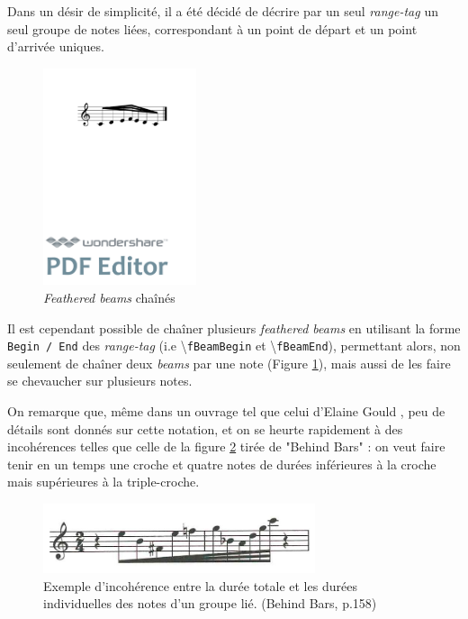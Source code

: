 \documentclass{article}
\newenvironment{gmncode}	{\vspace{-2mm}\small\verbatim}{\endverbatim\vspace{-2mm}}
\newcommand{\code}[1]		{{\small \texttt{#1}}}
\newcommand{\guidotag}[1]	{\textbackslash\code{#1}}
\begin{document}
Dans un désir de simplicité, il a été décidé de décrire par un seul \emph{range-tag} un seul groupe de notes liées, correspondant à un point de départ et un point d'arrivée uniques.

\begin{figure}[h]
\centering
\begin{gmncode}
[ 
  \fBeamBegin:1 c/8 d e/16 
  \fBeamBegin:2 f/32 \fBeamEnd:1 
  e/16 d/8 c \fBeamEnd:2 
]
\end{gmncode}
\includegraphics[width=45mm]{img/fBeamChaine.pdf}
\caption{\emph{Feathered beams} chaînés}
\label{fig:fbeamchain}
\end{figure}

Il est cependant possible de chaîner plusieurs \emph{feathered beams} en utilisant la forme \code{Begin / End} des \emph{range-tag} (i.e \guidotag{fBeamBegin} et \guidotag{fBeamEnd}), permettant alors, non seulement de chaîner deux \emph{beams} par une note (Figure \ref{fig:fbeamchain}), mais aussi de les faire se chevaucher sur plusieurs notes.


On remarque que, même dans un ouvrage tel que celui d'Elaine Gould \cite{gould2011behind}, peu de détails sont donnés sur cette notation, et on se heurte rapidement à des incohérences telles que celle de la figure \ref{fig:incoherence} tirée de "Behind Bars" : on veut faire tenir en un temps une croche et quatre notes de durées inférieures à la croche mais supérieures à la triple-croche. 

\begin{figure}[h]
\centering
\includegraphics[width=8cm]{img/behindbars.jpg}
\caption{Exemple d'incohérence entre la durée totale et les durées individuelles des notes d'un groupe lié. (Behind Bars, p.158) }
\label{fig:incoherence}
\end{figure}
\end{document}
